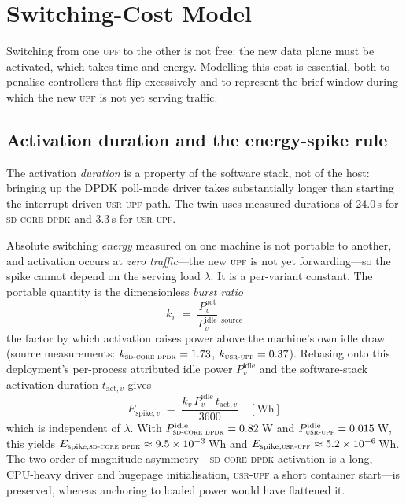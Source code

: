 \documentclass[12pt, a4paper]{report}
\newcommand{\dpdk}{\textsc{sd-core dpdk}}
\newcommand{\usr}{\textsc{usr-upf}}
\newcommand{\upf}{\textsc{upf}}
\begin{document}
\section{Switching-Cost Model}
\label{sec:dt_switching}

Switching from one \upf{} to the other is not free: the new data plane must be
activated, which takes time and energy. Modelling this cost is essential, both
to penalise controllers that flip excessively and to represent the brief
window during which the new \upf{} is not yet serving traffic.

\subsection{Activation duration and the energy-spike rule}

The activation \emph{duration} is a property of the software stack, not of the
host: bringing up the DPDK poll-mode driver takes substantially longer than
starting the interrupt-driven \usr{} path. The twin uses measured durations of
24.0\,s for \dpdk{} and 3.3\,s for \usr{}.

Absolute switching \emph{energy} measured on one machine is not portable to
another, and activation occurs at \emph{zero traffic}---the new \upf{} is not yet
forwarding---so the spike cannot depend on the serving load $\lambda$. It is a
per-variant constant. The portable quantity is the dimensionless
\emph{burst ratio}
\begin{equation}
  k_v \;=\; \frac{P^{\mathrm{act}}_{v}}{P^{\mathrm{idle}}_{v}}\bigg|_{\mathrm{source}}
  \label{eq:dt_burst}
\end{equation}
the factor by which activation raises power above the machine's own idle draw
(source measurements: $k_{\dpdk}=1.73$, $k_{\usr}=0.37$). Rebasing onto this
deployment's per-process attributed idle power $P^{\mathrm{idle}}_{v}$ and the
software-stack activation duration $t_{\mathrm{act},v}$ gives
\begin{equation}
  E_{\mathrm{spike},v} \;=\;
  \frac{k_v \, P^{\mathrm{idle}}_{v} \, t_{\mathrm{act},v}}{3600}\quad[\text{Wh}]
  \label{eq:dt_spike}
\end{equation}
which is independent of $\lambda$. With $P^{\mathrm{idle}}_{\dpdk}=0.82$\,W and
$P^{\mathrm{idle}}_{\usr}=0.015$\,W, this yields
$E_{\mathrm{spike},\dpdk}\approx 9.5\times10^{-3}$\,Wh and
$E_{\mathrm{spike},\usr}\approx 5.2\times10^{-6}$\,Wh. The two-order-of-magnitude
asymmetry---\dpdk{} activation is a long, CPU-heavy driver and hugepage
initialisation, \usr{} a short container start---is preserved, whereas anchoring
to loaded power would have flattened it.
\end{document}
